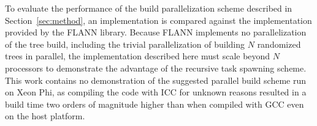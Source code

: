 
   To evaluate the performance of the build parallelization scheme described in Section~\ref{sec:method}, an implementation is compared against the implementation provided by the FLANN library. Because FLANN implements no parallelization of the tree build, including the trivial parallelization of building $N$ randomized trees in parallel, the implementation described here must scale beyond $N$ processors to demonstrate the advantage of the recursive task
  spawning scheme. This work contains no demonstration of the suggested parallel build scheme run on Xeon Phi, as compiling the code with ICC for unknown reasons resulted in a build time two orders of magnitude higher than when compiled with GCC even on the host platform.

